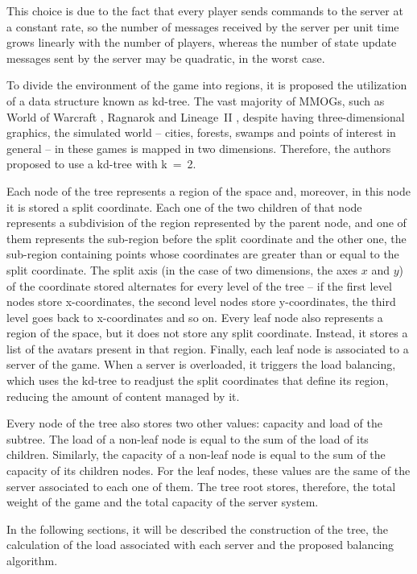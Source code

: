 This choice is due to the fact that every player sends commands to the server at a constant rate, so the number of messages received by the server per unit time grows linearly with the number of players, whereas the number of state update messages sent by the server may be quadratic, in the worst case.

To divide the environment of the game into regions, it is proposed the utilization of a data structure known as kd-tree. The vast majority of MMOGs, such as World of Warcraft \cite{worldofwarcraft}, Ragnarok \cite{ragnarok} and \mbox{Lineage II} \cite{lineage2}, despite having three-dimensional graphics, the simulated world -- cities, forests, swamps and points of interest in general -- in these games is mapped in two dimensions. Therefore, the authors proposed to use a kd-tree with \mbox{k = 2}.

Each node of the tree represents a region of the space and, moreover, in this node it is stored a split coordinate. Each one of the two children of that node represents a subdivision of the region represented by the parent node, and one of them represents the sub-region before the split coordinate and the other one, the sub-region containing points whose coordinates are greater than or equal to the split coordinate. The split axis (in the case of two dimensions, the axes $x$ and $y$) of the coordinate stored alternates for every level of the tree -- if the first level nodes store x-coordinates, the second level nodes store y-coordinates, the third level goes back to x-coordinates and so on. Every leaf node also represents a region of the space, but it does not store any split coordinate. Instead, it stores a list of the avatars present in that region. Finally, each leaf node is associated to a server of the game. When a server is overloaded, it triggers the load balancing, which uses the kd-tree to readjust the split coordinates that define its region, reducing the amount of content managed by it.

Every node of the tree also stores two other values: capacity and load of the subtree. The load of a non-leaf node is equal to the sum of the load of its children. Similarly, the capacity of a non-leaf node is equal to the sum of the capacity of its children nodes. For the leaf nodes, these values are the same of the server associated to each one of them. The tree root stores, therefore, the total weight of the game and the total capacity of the server system.

In the following sections, it will be described the construction of the tree, the calculation of the load associated with each server and the proposed balancing algorithm.

